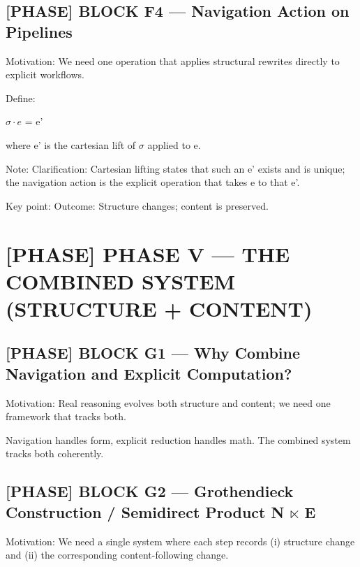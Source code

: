 \subsection*{[PHASE] BLOCK F4 --- Navigation Action on Pipelines}

Motivation: We need one operation that applies structural rewrites directly to explicit workflows.\par

Define:\par

$\sigma \cdot e$ = e'\par

where e' is the cartesian lift of $\sigma$ applied to e.\par

Note: Clarification: Cartesian lifting states that such an e' exists and is unique; the navigation action is the explicit operation that takes e to that e'.\par

Key point: Outcome: Structure changes; content is preserved.\par

\section*{[PHASE] PHASE V --- THE COMBINED SYSTEM (STRUCTURE + CONTENT)}

\subsection*{[PHASE] BLOCK G1 --- Why Combine Navigation and Explicit Computation?}

Motivation: Real reasoning evolves both structure and content; we need one framework that tracks both.\par

Navigation handles form, explicit reduction handles math. The combined system tracks both coherently.\par

\subsection*{[PHASE] BLOCK G2 --- Grothendieck Construction / Semidirect Product N $\ltimes$ E}

Motivation: We need a single system where each step records (i) structure change and (ii) the corresponding content-following change.\par

